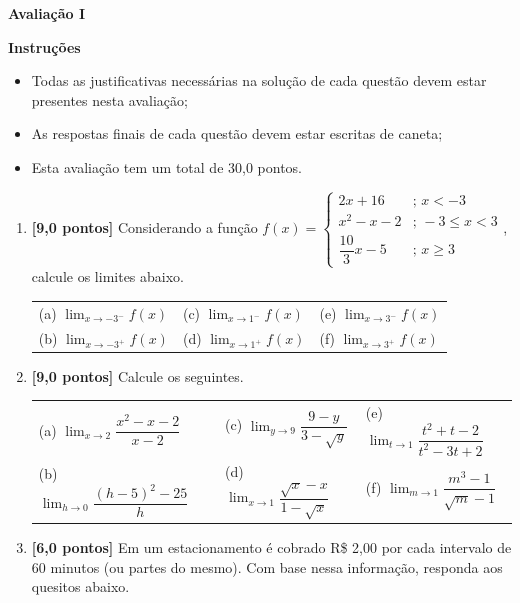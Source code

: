 \documentclass[12pt,a4paper]{article}
\begin{document}
\begin{center}
 \textbf{Avaliação I}
\end{center}

\textbf{Instruções}
\begin{itemize}
 \item Todas as justificativas necessárias na solução de cada questão devem estar presentes nesta avaliação;
 \item As respostas finais de cada questão devem estar escritas de caneta;
 \item Esta avaliação tem um total de 30,0 pontos.
\end{itemize}

\begin{enumerate}
  \item \textbf{[9,0 pontos]} Considerando a função 
    $f(x)=\begin{cases}
      2x+16 & ;\, x<-3\\
      x^{2}-x-2 & ;\,-3\leq x<3\\
      \dfrac{10}{3}x-5 & ;\, x\geq3
    \end{cases}$, calcule os limites abaixo.

    \begin{tabular}{lll}
      (a) ${\displaystyle \lim_{x\to-3^{-}}f(x)}$ & 
      (c) ${\displaystyle \lim_{x\to 1^{-}}f(x)}$ & 
      (e) ${\displaystyle \lim_{x\to3^{-}}f(x)}$ \\
      (b) ${\displaystyle \lim_{x\to-3^{+}}f(x)}$ &
      (d) ${\displaystyle \lim_{x\to 1^{+}}f(x)}$ & 
      (f) ${\displaystyle \lim_{x\to3^{+}}f(x)}$
    \end{tabular}

  \item \textbf{[9,0 pontos]} Calcule os seguintes.

    \begin{tabular}{lll}
      (a) ${\displaystyle \lim_{x\to2}\dfrac{x^{2}-x-2}{x-2}}$ & 
      (c) ${\displaystyle \lim_{y\to9}\dfrac{9-y}{3-\sqrt{y}}}$ & 
      (e) ${\displaystyle \lim_{t\to1}\dfrac{t^{2}+t-2}{t^{2}-3t+2}}$ \\
      (b) ${\displaystyle \lim_{h\to0}\dfrac{(h-5)^{2}-25}{h}}$ & 
      (d) ${\displaystyle \lim_{x\to1}\dfrac{\sqrt{x}-x}{1-\sqrt{x}}}$ &  
      (f) ${\displaystyle \lim_{m \to 1}\dfrac{m^3 - 1}{\sqrt{m} - 1}}$
    \end{tabular}

  \item \textbf{[6,0 pontos]} Em um estacionamento é cobrado R\$ 2,00 por cada intervalo de 60
    minutos (ou partes do mesmo). Com base nessa informação, responda
    aos quesitos abaixo.


\end{enumerate}
\end{document}
